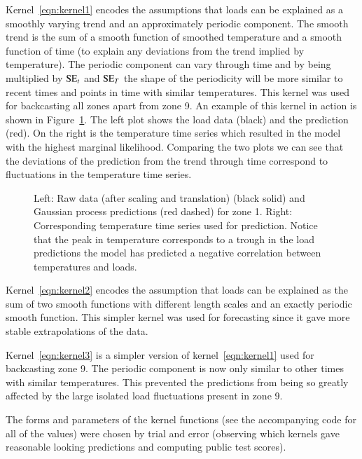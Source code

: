\documentclass[preprint,authoryear,12pt]{elsarticle}
\newcommand{\acro}[1]{\textsc{#1}}
\def\SE{\acro{SE}}
\begin{document}
Kernel~\eqref{eqn:kernel1} encodes the assumptions that loads can be explained as a smoothly varying trend and an approximately periodic component.
The smooth trend is the sum of a smooth function of smoothed temperature and a smooth function of time (to explain any deviations from the trend implied by temperature).
The periodic component can vary through time and by being multiplied by $\SE_t$ and $\SE_T$ the shape of the periodicity will be more similar to recent times and points in time with similar temperatures.
This kernel was used for backcasting all zones apart from zone 9.
An example of this kernel in action is shown in Figure~\ref{fig:load_pred}.
The left plot shows the load data (black) and the prediction (red).
On the right is the temperature time series which resulted in the model with the highest marginal likelihood.
Comparing the two plots we can see that the deviations of the prediction from the trend through time correspond to fluctuations in the temperature time series.

\begin{figure}[ht]
  \begin{center}
    
  \end{center}
  \caption{Left: Raw data (after scaling and translation) (black solid) and Gaussian process predictions (red dashed) for zone 1. Right: Corresponding temperature time series used for prediction. Notice that the peak in temperature corresponds to a trough in the load predictions \ie the model has predicted a negative correlation between temperatures and loads.}
  \label{fig:load_pred}
\end{figure}

Kernel~\eqref{eqn:kernel2} encodes the assumption that loads can be explained as the sum of two smooth functions with different length scales and an exactly periodic smooth function.
This simpler kernel was used for forecasting since it gave more stable extrapolations of the data.

Kernel~\eqref{eqn:kernel3} is a simpler version of kernel~\eqref{eqn:kernel1} used for backcasting zone 9.
The periodic component is now only similar to other times with similar temperatures.
This prevented the predictions from being so greatly affected by the large isolated load fluctuations present in zone 9.

The forms and parameters of the kernel functions (see the accompanying code for all of the values) were chosen by trial and error (observing which kernels gave reasonable looking predictions and computing public test scores).
\end{document}

